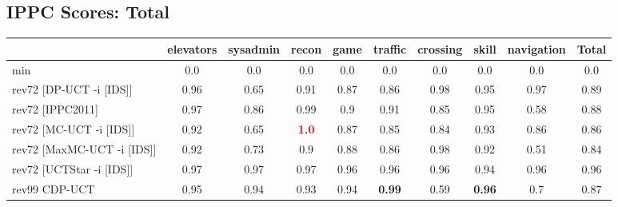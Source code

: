 \documentclass{article}
\begin{document}
\bigskip

\subsection*{IPPC Scores: Total}

\begin{tabular}{|l|r@{$\pm$}rr@{$\pm$}rr@{$\pm$}rr@{$\pm$}rr@{$\pm$}rr@{$\pm$}rr@{$\pm$}rr@{$\pm$}rr@{$\pm$}r|}
\hline

& \multicolumn{2}{c}{elevators}
& \multicolumn{2}{c}{sysadmin}
& \multicolumn{2}{c}{recon}
& \multicolumn{2}{c}{game}
& \multicolumn{2}{c}{traffic}
& \multicolumn{2}{c}{crossing}
& \multicolumn{2}{c}{skill}
& \multicolumn{2}{c}{navigation}
& \multicolumn{2}{c|}{Total}
\\
\hline
\hline
min
& \multicolumn{2}{c}{0.0}
& \multicolumn{2}{c}{0.0}
& \multicolumn{2}{c}{0.0}
& \multicolumn{2}{c}{0.0}
& \multicolumn{2}{c}{0.0}
& \multicolumn{2}{c}{0.0}
& \multicolumn{2}{c}{0.0}
& \multicolumn{2}{c}{0.0}
& \multicolumn{2}{c|}{0.0}
\\
rev72 [DP-UCT -i [IDS]]
& \multicolumn{2}{c}{0.96}
& \multicolumn{2}{c}{0.65}
& \multicolumn{2}{c}{0.91}
& \multicolumn{2}{c}{0.87}
& \multicolumn{2}{c}{0.86}
& \multicolumn{2}{c}{0.98}
& \multicolumn{2}{c}{0.95}
& \multicolumn{2}{c}{0.97}
& \multicolumn{2}{c|}{0.89}
\\
rev72 [IPPC2011]
& \multicolumn{2}{c}{0.97}
& \multicolumn{2}{c}{0.86}
& \multicolumn{2}{c}{0.99}
& \multicolumn{2}{c}{0.9}
& \multicolumn{2}{c}{0.91}
& \multicolumn{2}{c}{0.85}
& \multicolumn{2}{c}{0.95}
& \multicolumn{2}{c}{0.58}
& \multicolumn{2}{c|}{0.88}
\\
rev72 [MC-UCT -i [IDS]]
& \multicolumn{2}{c}{0.92}
& \multicolumn{2}{c}{0.65}
& \multicolumn{2}{c}{\textbf{\textcolor{red}{1.0}}}
& \multicolumn{2}{c}{0.87}
& \multicolumn{2}{c}{0.85}
& \multicolumn{2}{c}{0.84}
& \multicolumn{2}{c}{0.93}
& \multicolumn{2}{c}{0.86}
& \multicolumn{2}{c|}{0.86}
\\
rev72 [MaxMC-UCT -i [IDS]]
& \multicolumn{2}{c}{0.92}
& \multicolumn{2}{c}{0.73}
& \multicolumn{2}{c}{0.9}
& \multicolumn{2}{c}{0.88}
& \multicolumn{2}{c}{0.86}
& \multicolumn{2}{c}{0.98}
& \multicolumn{2}{c}{0.92}
& \multicolumn{2}{c}{0.51}
& \multicolumn{2}{c|}{0.84}
\\
rev72 [UCTStar -i [IDS]]
& \multicolumn{2}{c}{0.97}
& \multicolumn{2}{c}{0.97}
& \multicolumn{2}{c}{0.97}
& \multicolumn{2}{c}{0.96}
& \multicolumn{2}{c}{0.96}
& \multicolumn{2}{c}{0.96}
& \multicolumn{2}{c}{0.94}
& \multicolumn{2}{c}{0.96}
& \multicolumn{2}{c|}{0.96}
\\
\hline
rev99 CDP-UCT
& \multicolumn{2}{c}{0.95}
& \multicolumn{2}{c}{0.94}
& \multicolumn{2}{c}{0.93}
& \multicolumn{2}{c}{0.94}
& \multicolumn{2}{c}{\textbf{0.99}}
& \multicolumn{2}{c}{0.59}
& \multicolumn{2}{c}{\textbf{0.96}}
& \multicolumn{2}{c}{0.7}
& \multicolumn{2}{c|}{0.87}
\\
\hline
\end{tabular}%

\bigskip
\end{document}
